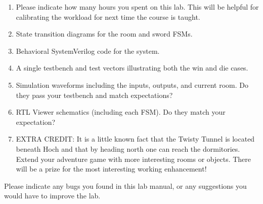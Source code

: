 \documentclass{../../e85}
\date{2019 February 25 (Monday)}
\author{}
\begin{document}
\begin{enumerate}
\item Please indicate how many hours you spent on this lab.  This will
  be helpful for calibrating the workload for next time the course is
  taught.

  \begin{solution}

  \end{solution}

\item State transition diagrams for the room and sword FSMs.

  \begin{solution}

  \end{solution}

\item Behavioral SystemVerilog code for the system.

  \begin{solution}

  \end{solution}

\item A single testbench and test vectors illustrating both the win
  and die cases.

  \begin{solution}

  \end{solution}

\item Simulation waveforms including the inputs, outputs, and current
  room.  Do they pass your testbench and match expectations?

  \begin{solution}

  \end{solution}

\item RTL Viewer schematics (including each FSM).  Do they match your
  expectation?

  \begin{solution}

  \end{solution}

\item EXTRA CREDIT: It is a little known fact that the Twisty Tunnel
  is located beneath Hoch and that by heading north one can reach the
  dormitories.  Extend your adventure game with more interesting rooms
  or objects.  There will be a prize for the most interesting working
  enhancement!

  \begin{solution}

  \end{solution}
\end{enumerate}

Please indicate any bugs you found in this lab manual, or any
suggestions you would have to improve the lab.

\begin{solution}

\end{solution}
\end{document}
